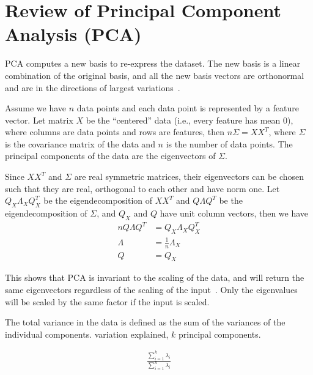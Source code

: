 \chapter{Review of Principal Component Analysis (PCA)}\label{app:pca}
PCA computes a new basis to re-express the dataset. The new basis is a linear
combination of the original basis, and all the new basis vectors are orthonormal
and are in the directions of largest variations~\cite{shlens2005}.

Assume we have $n$ data points and each data point is represented by a feature
vector. Let matrix $X$ be the ``centered'' data (i.e., every feature has mean
0), where columns are data points and rows are features, then $n\Sigma = XX^T$,
where $\Sigma$ is the covariance matrix of the data and $n$ is the number of
data points. The principal components of the data are the eigenvectors of
$\Sigma$.

Since $XX^T$ and $\Sigma$ are real symmetric matrices, their eigenvectors can be
chosen such that they are real, orthogonal to each other and have norm one. Let
$Q_X\Lambda_X Q_X^T$ be the  eigendecomposition of $XX^T$ and $Q\Lambda Q^T$ be
the eigendecomposition of $\Sigma$, and $Q_X$ and $Q$ have unit column
vectors, then we have
\begin{align*}
nQ\Lambda Q^T &= Q_X\Lambda_X Q_X^T  \\
\Lambda &= \frac{1}{n}\Lambda_X \\
Q &= Q_X
\end{align*}

This shows that PCA is invariant to the scaling of the data, and will return the
same eigenvectors regardless of the scaling of the input~\cite{pca14}. Only the
eigenvalues will be scaled by the same factor if the input is scaled. 

The total variance in the data is defined as the sum of the variances
of the individual components. variation explained, $k$ principal components.

\begin{align}
\frac{\sum_{i=1}^{k} \lambda_i}{\sum_{i=1}^{n}\lambda_i}
\end{align}
